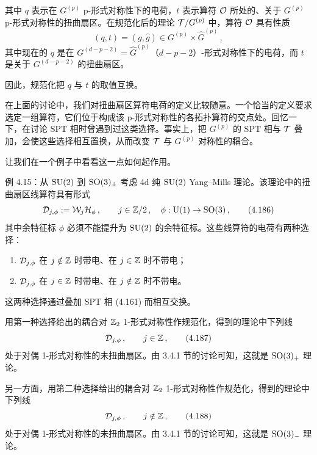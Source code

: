
其中 $q$ 表示在 $G^{(p)}$ p-形式对称性下的电荷，$t$ 表示算符 $\mathcal{O}$ 所处的、关于 $G^{(p)}$ p-形式对称性的扭曲扇区。在规范化后的理论 $\mathcal{T}/G^{(p)}$ 中，算符 $\mathcal{O}$ 具有性质
\begin{equation}
  (q,t)=(g,\hat{g})\in G^{(p)}\times\hat{G}^{(p)}\,, \tag{4.185}
\end{equation}
其中现在的 $q$ 是在 $G^{(d-p-2)}=\hat{G}^{(p)}$（$d-p-2$）-形式对称性下的电荷，而 $t$ 是关于 $G^{(d-p-2)}$ 的扭曲扇区。

因此，规范化把 $q$ 与 $t$ 的取值互换。



在上面的讨论中，我们对扭曲扇区算符电荷的定义比较随意。一个恰当的定义要求选定一组算符，它们位于构成该 p-形式对称性的各拓扑算符的交点处。回忆一下，在讨论 SPT 相时曾遇到过这类选择。事实上，把 $G^{(p)}$ 的 SPT 相与 $\mathcal{T}$ 叠加，会使这些选择相互置换，从而改变 $\mathcal{T}$ 与 $G^{(p)}$ 对称性的耦合。

让我们在一个例子中看看这一点如何起作用。

\begin{examplebox}{例 4.15：从 $\mathrm{SU}(2)$ 到 $\mathrm{SO}(3)_\pm$}
考虑 4d 纯 $\mathrm{SU}(2)$ Yang--Mills 理论。该理论中的扭曲扇区线算符具有形式
\begin{equation}
  \mathcal{D}_{j,\phi}:=\mathcal{W}_j\mathcal{H}_\phi\,,\qquad j\in\mathbb{Z}/2\,,\quad \phi:\mathrm{U}(1)\to\mathrm{SO}(3)\,, \tag{4.186}
\end{equation}
其中余特征标 $\phi$ 必须不能提升为 $\mathrm{SU}(2)$ 的余特征标。这些线算符的电荷有两种选择：
\begin{enumerate}[leftmargin=1.4em,itemsep=1pt,topsep=1pt]
\item $\mathcal{D}_{j,\phi}$ 在 $j\notin\mathbb{Z}$ 时带电、在 $j\in\mathbb{Z}$ 时不带电；
\item $\mathcal{D}_{j,\phi}$ 在 $j\in\mathbb{Z}$ 时带电、在 $j\notin\mathbb{Z}$ 时不带电。
\end{enumerate}
这两种选择通过叠加 SPT 相 (4.161) 而相互交换。

用第一种选择给出的耦合对 $\mathbb{Z}_2$ 1-形式对称性作规范化，得到的理论中下列线
\begin{equation}
  \mathcal{D}_{j,\phi}\,,\qquad j\in\mathbb{Z}\,, \tag{4.187}
\end{equation}
处于对偶 1-形式对称性的未扭曲扇区。由 3.4.1 节的讨论可知，这就是 $\mathrm{SO}(3)_+$ 理论。

另一方面，用第二种选择给出的耦合对 $\mathbb{Z}_2$ 1-形式对称性作规范化，得到的理论中下列线
\begin{equation}
  \mathcal{D}_{j,\phi}\,,\qquad j\notin\mathbb{Z}\,, \tag{4.188}
\end{equation}
处于对偶 1-形式对称性的未扭曲扇区。由 3.4.1 节的讨论可知，这就是 $\mathrm{SO}(3)_-$ 理论。
\end{examplebox}

